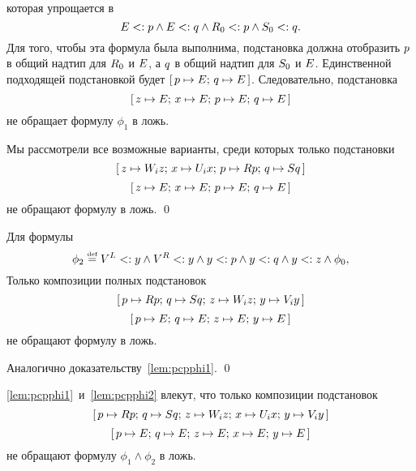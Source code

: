 \begin{proof*}
\begin{itemize}
\[\begin{array}{l}
            \end{array}
        \] которая упрощается в 
        \[
            {E} <: p \land {E} <: q \land {R}_{0} <: p \land {S}_{0} <: q.
        \]
        Для того, чтобы эта формула была выполнима, подстановка должна отобразить $p$ в общий надтип для ${R}_{0}$ и ${E}$, а $q$ в общий надтип для ${S}_{0}$ и ${E}$. Единственной подходящей подстановкой будет $\textrm{[} \, p \mapsto {E}; \, q \mapsto {E} \, \textrm{]}$. Следовательно, подстановка
        \[
            \textrm{[} \, z \mapsto {E}; \, x \mapsto {E}; \, p \mapsto {E}; \, q \mapsto {E} \, \textrm{]}
        \] не обращает формулу $\phi_{1}$ в ложь.
        
\end{itemize}
Мы рассмотрели все возможные варианты, среди которых только подстановки
\[
    \textrm{[} \, z \mapsto {W}_{i}z; \, x \mapsto {U}_{i}x; \, p \mapsto {R}p; \, q \mapsto {S}q \, \textrm{]}
\]
\[
    \textrm{[} \, z \mapsto {E}; \, x \mapsto {E}; \, p \mapsto {E}; \, q \mapsto {E} \, \textrm{]}
\] не обращают формулу в ложь.
\qed\end{proof*}
%
\begin{lem}{\label{lem:pcpphi2}}
Для формулы
\[
    \phi_{2} \mathrel{\stackrel{\mbox{\normalfont\tiny def}}{=}} {V}^{L} <: y \land {V}^{R} <: y \land y <: p \land y <: q \land y <: z \land \phi_{0},
\]
Только композиции полных подстановок
\[
    \textrm{[} \, p \mapsto {R}p; \, q \mapsto {S}q; \,
    z \mapsto {W}_{i}z; \,
    y \mapsto {V}_{i}y \, \textrm{]}
\]
\[
    \textrm{[} \, p \mapsto {E}; \, q \mapsto {E}; \,
    z \mapsto {E}; \, y \mapsto {E} \, \textrm{]}
\] не обращают формулу в ложь.
\end{lem}
\begin{proof*}
Аналогично доказательству~\autoref{lem:pcpphi1}.
\qed\end{proof*}
\autoref{lem:pcpphi1}~и~\autoref{lem:pcpphi2} влекут, что только композиции подстановок
\[
    \textrm{[} \, p \mapsto {R}p; \, q \mapsto {S}q; \,
    z \mapsto {W}_{i}z; \,
    x \mapsto {U}_{i}x; \,
    y \mapsto {V}_{i}y \, \textrm{]}
\]
\[
    \textrm{[} \, p \mapsto {E}; \, q \mapsto {E}; \,
    z \mapsto {E}; \, x \mapsto {E}; \,
    y \mapsto {E} \, \textrm{]}
\]
не обращают формулу $\phi_{1} \land \phi_{2}$ в ложь.

